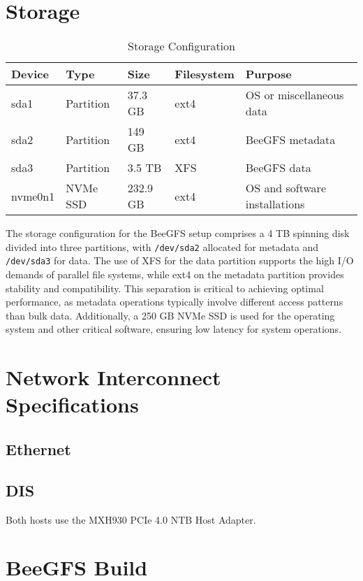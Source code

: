 \section{Storage}
\begin{table}[htbp]
    \centering
    \caption{Storage Configuration}
    \label{tab:storage_config}
    \begin{tabular}{llp{2.5cm}lp{4cm}}
        \toprule
        \textbf{Device} & \textbf{Type} & \textbf{Size} & \textbf{Filesystem} & \textbf{Purpose} \\
        \midrule
        sda1 & Partition & 37.3 GB & ext4 & OS or miscellaneous data \\
        sda2 & Partition & 149 GB & ext4 & BeeGFS metadata \\
        sda3 & Partition & 3.5 TB & XFS & BeeGFS data \\
        nvme0n1 & NVMe SSD & 232.9 GB & ext4 & OS and software installations \\
        \bottomrule
    \end{tabular}
\end{table}

\noindent
The storage configuration for the BeeGFS setup comprises a 4 TB spinning disk divided into three partitions, with \texttt{/dev/sda2} allocated for metadata and \texttt{/dev/sda3} for data. The use of XFS for the data partition supports the high I/O demands of parallel file systems, while ext4 on the metadata partition provides stability and compatibility. This separation is critical to achieving optimal performance, as metadata operations typically involve different access patterns than bulk data. Additionally, a 250 GB NVMe SSD is used for the operating system and other critical software, ensuring low latency for system operations.

\section{Network Interconnect Specifications}
\subsection{Ethernet}

\subsection{DIS}
Both hosts use the MXH930 PCIe 4.0 NTB Host Adapter.
\section{BeeGFS Build}